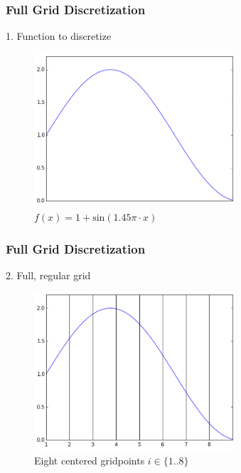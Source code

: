 \begin{frame}
  \frametitle{Full Grid Discretization}
  \topline
  \vspace{-10px}
  \begin{block}{1. Function to discretize}
    \begin{figure}[!htp]

      \centering
      \includegraphics[width=7.5cm]{images/singlebasis_1}
      \vspace{-12px}
      \caption{$f(x) = 1 + \text{sin}(1.45\pi \cdot x)$}
    \end{figure}
  \end{block}
\end{frame}

\begin{frame}
  \frametitle{Full Grid Discretization}
  \topline
  \vspace{-10px}
  \begin{block}{2. Full, regular grid}
    \begin{figure}[!htp]

      \centering
      \includegraphics[width=7.5cm]{images/singlebasis_2}
      \vspace{-12px}
      \caption{Eight centered gridpoints $i \in \{1..8\}$}
    \end{figure}
  \end{block}
\end{frame}

